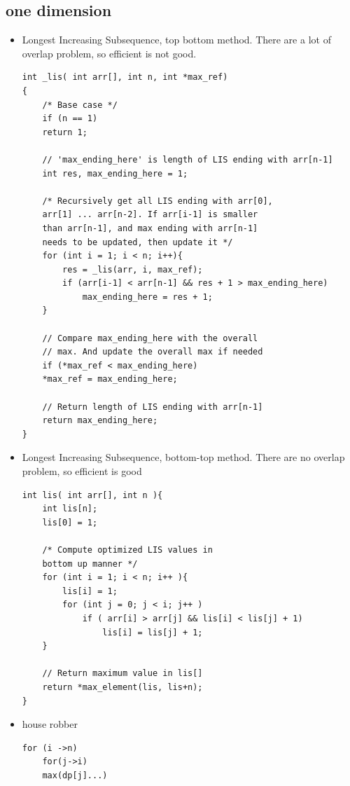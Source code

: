 \documentclass[a4paper,11pt,twoside]{book}
\begin{document}
\subsection{one dimension}
\begin{itemize}
	\item Longest Increasing Subsequence, top bottom method. There are a lot of overlap problem, so efficient is not good.

\begin{lstlisting}[numbers=none]
int _lis( int arr[], int n, int *max_ref)
{
	/* Base case */
	if (n == 1)
	return 1;
	
	// 'max_ending_here' is length of LIS ending with arr[n-1]
	int res, max_ending_here = 1;
	
	/* Recursively get all LIS ending with arr[0],
	arr[1] ... arr[n-2]. If arr[i-1] is smaller
	than arr[n-1], and max ending with arr[n-1]
	needs to be updated, then update it */
	for (int i = 1; i < n; i++){
		res = _lis(arr, i, max_ref);
		if (arr[i-1] < arr[n-1] && res + 1 > max_ending_here)
			max_ending_here = res + 1;
	}
	
	// Compare max_ending_here with the overall
	// max. And update the overall max if needed
	if (*max_ref < max_ending_here)
	*max_ref = max_ending_here;
	
	// Return length of LIS ending with arr[n-1]
	return max_ending_here;
}
\end{lstlisting}

\item Longest Increasing Subsequence, bottom-top method. There are no overlap problem, so efficient is good

\begin{lstlisting}[numbers=none]
int lis( int arr[], int n ){
	int lis[n];
	lis[0] = 1;  
	
	/* Compute optimized LIS values in
	bottom up manner */
	for (int i = 1; i < n; i++ ){
		lis[i] = 1;
		for (int j = 0; j < i; j++ ) 
			if ( arr[i] > arr[j] && lis[i] < lis[j] + 1)
				lis[i] = lis[j] + 1;
	}
	
	// Return maximum value in lis[]
	return *max_element(lis, lis+n);
}
\end{lstlisting}


\item house robber
\begin{lstlisting}[numbers=none]
	for (i ->n)
	for(j->i)
	max(dp[j]...)
\end{lstlisting}





\end{itemize}
\end{document}
